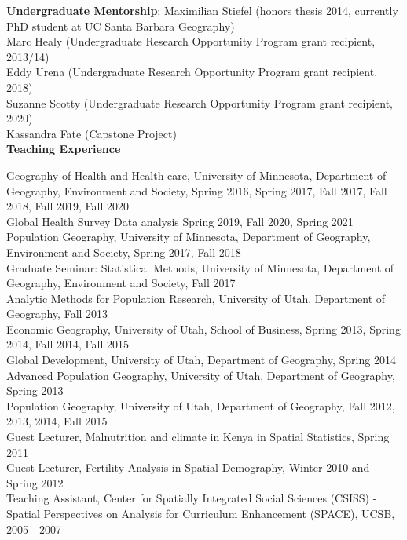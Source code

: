 \documentclass[11pt]{article} %
\begin{document}
\noindent
\textbf{Undergraduate Mentorship}:
 Maximilian Stiefel (honors thesis 2014, currently PhD student at UC Santa Barbara Geography)\\
 Marc Healy (Undergraduate Research Opportunity Program grant recipient, 2013/14)\\
 Eddy Urena (Undergraduate Research Opportunity Program grant recipient, 2018)\\
 Suzanne Scotty (Undergraduate Research Opportunity Program grant recipient, 2020)\\
 Kassandra Fate (Capstone Project)\\

\vspace{0.5cm}
\noindent
\textbf{Teaching Experience}

\noindent
Geography of Health and Health care, University of Minnesota, Department of Geography, Environment and Society, Spring 2016, Spring 2017, Fall 2017, Fall 2018, Fall 2019, Fall 2020\\
Global Health Survey Data analysis Spring 2019, Fall 2020, Spring 2021\\
Population Geography, University of Minnesota, Department of Geography, Environment and Society, Spring 2017, Fall 2018\\
Graduate Seminar: Statistical Methods, University of Minnesota, Department of Geography, Environment and Society, Fall 2017\\
Analytic Methods for Population Research, University of Utah, Department of Geography, Fall 2013\\
Economic Geography, University of Utah, School of Business, Spring 2013, Spring 2014, Fall 2014, Fall 2015\\
Global Development, University of Utah, Department of Geography, Spring 2014\\
Advanced Population Geography, University of Utah, Department of Geography, Spring 2013\\
Population Geography, University of Utah, Department of Geography, Fall 2012, 2013, 2014, Fall 2015\\
Guest Lecturer, Malnutrition and climate in Kenya in Spatial Statistics, Spring 2011\\
Guest Lecturer, Fertility Analysis in Spatial Demography, Winter 2010 and Spring 2012 \\
Teaching Assistant, Center for Spatially Integrated Social Sciences (CSISS) -  Spatial Perspectives on Analysis for Curriculum Enhancement (SPACE), UCSB, 2005 - 2007\\
\end{document}
